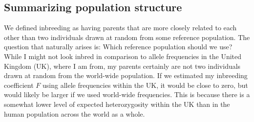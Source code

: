 \subsection{Summarizing population structure}
We defined inbreeding as having parents that are
more closely related to each other than two individuals drawn at random from some reference population. The question that naturally arises is: Which reference population should we use? While I might not look inbred in
comparison to allele frequencies in the United Kingdom (UK), where I am from, my
parents certainly are not two individuals drawn at random from the
world-wide population. If we estimated my inbreeding coefficient $F$ using allele frequencies
within the UK, it would 
be close to zero, but would likely be larger if we used world-wide
frequencies. This is because there is a somewhat lower level of
expected heterozygosity within the UK than in the human population across the world as a whole.\\

